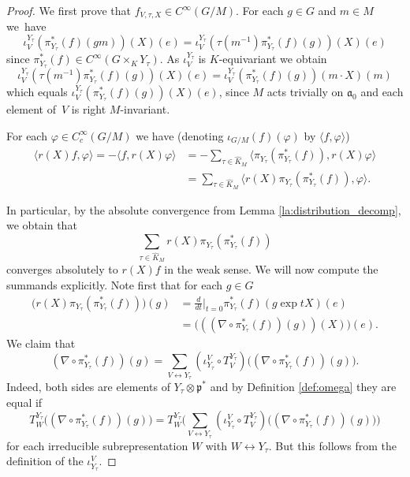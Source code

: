 \documentclass[JEP,XML,SOM,NoFloatCountersInSection,Unicode,published]{cedram}
\let\cdotm\cdot
\theoremstyle{definition}
\renewcommand{\d}[1][t]{\ensuremath{\frac{d}{d#1}\Big|_{#1=0}}}
\newcommand{\mf}[1]{\ensuremath{\mathfrak{#1}}}
\begin{document}
\begin{proof}
We first prove that $f_{V,\tau,X}\in C^\infty(G/M)$. For each $g\in G$ and $m\in M$ we~have
\[
\iota_V^{Y_{\tau}}(\pi_{Y_\tau}^*(f)(gm))(X)(e)=\iota_V^{Y_{\tau}}(\tau(m^{-1})\pi_{Y_\tau}^*(f)(g))(X)(e)
\]
since $\pi_{Y_\tau}^*(f)\in C^\infty(G\times_KY_\tau)$. As $\iota_V^{Y_{\tau}}$ is $K$-equivariant we obtain
\[
\iota_V^{Y_{\tau}}(\tau(m^{-1})\pi_{Y_\tau}^*(f)(g))(X)(e)=\iota_V^{Y_{\tau}}(\pi_{Y_\tau}^*(f)(g))(m\cdotm X)(m)
\]
which equals $\iota_V^{Y_{\tau}}(\pi_{Y_\tau}^*(f)(g))(X)(e)$, since $M$ acts trivially on $\mf a_0$ and each element of~$V$ is right $M$-invariant.

For each $\varphi\in C_c^\infty(G/M)$ we have (denoting $\iota_{G/M}(f)(\varphi)$ by $\langle f,\varphi\rangle$)
\begin{align*}
\langle r(X)f,\varphi\rangle=-\langle f,r(X)\varphi\rangle&=-\sum_{\tau\in\hat K_M}\langle\pi_{Y_\tau}(\pi_{Y_\tau}^*(f)),r(X)\varphi\rangle\\
&=\sum_{\tau\in\hat K_M}\langle r(X)\pi_{Y_\tau}(\pi_{Y_\tau}^*(f)),\varphi\rangle.
\end{align*}

\pagebreak[2]
In particular, by the absolute convergence from Lemma \ref{la:distribution_decomp}, we obtain that
\[
\sum_{\tau\in\hat K_M}r(X)\pi_{Y_\tau}(\pi_{Y_\tau}^*(f))
\]
converges absolutely to $r(X)f$ in the weak sense. We will now compute the summands explicitly. Note first that for each $g\in G$
\begin{equation}\label{eq:proof_a_action_gen1}
\begin{aligned}
\bigl(r(X)\pi_{Y_\tau}(\pi_{Y_\tau}^*(f))\bigr)(g)&=\d\pi_{Y_\tau}^*(f)(g\exp tX)(e)\\
&=\bigl(((\nabla\circ\pi_{Y_\tau}^*(f))(g))(X)\bigr)(e).
\end{aligned}
\end{equation}
We claim that
\[
(\nabla\circ\pi_{Y_\tau}^*(f))(g)=\sum_{V\leftrightarrow Y_\tau}(\iota^V_{Y_{\tau}}\circ T^{Y_{\tau}}_V) \bigl((\nabla\circ\pi_{Y_\tau}^*(f))(g) \bigr).
\]
Indeed, both sides are elements of $Y_\tau\otimes\mf p^*$ and by Definition \ref{def:omega} they are equal if
\[
T^{Y_\tau}_W \bigl((\nabla\circ\pi_{Y_\tau}^*(f))(g) \bigr)=T^{Y_\tau}_W \biggl(\sum_{V\leftrightarrow Y_\tau}(\iota^V_{Y_{\tau}}\circ T^{Y_{\tau}}_V) \bigl((\nabla\circ\pi_{Y_\tau}^*(f))(g) \bigr) \biggr)
\]
for each irreducible subrepresentation $W$ with $W\leftrightarrow Y_\tau$. But this follows from the definition of the $\iota^V_{Y_\tau}$.


\end{proof}
\end{document}
